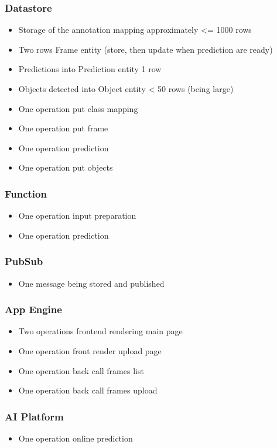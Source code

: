\subsubsection{Datastore}
\begin{itemize}
    \item Storage of the annotation mapping approximately <= 1000 rows
    \item Two rows Frame entity (store, then update when prediction are ready)
    \item Predictions into Prediction entity 1 row
    \item Objects detected into Object entity < 50 rows (being large)
    \item One operation put class mapping
    \item One operation put frame
    \item One operation prediction
    \item One operation put objects
\end{itemize}
\subsubsection{Function}
\begin{itemize}
    \item One operation input preparation
    \item One operation prediction
\end{itemize}
\subsubsection{PubSub}
\begin{itemize}
    \item One message being stored and published
\end{itemize}
\subsubsection{App Engine}
\begin{itemize}
    \item Two operations frontend rendering main page
    \item One operation front render upload page
    \item One operation back call frames list
    \item One operation back call frames upload
\end{itemize}
\subsubsection{AI Platform}
\begin{itemize}
    \item One operation online prediction
\end{itemize}

